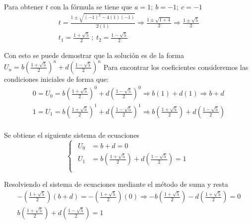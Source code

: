 \documentclass[letterpaper,11pt]{article}
\begin{document}
Para obtener $t$ con la fórmula se tiene que $a = 1; \ b = -1; \ c = -1$
\begin{equation*}
\begin{aligned}
	t = \frac{1 \pm \sqrt{(-1)^2 - 4(1)(-1)}}{2(1)} \Rightarrow \frac{1 \pm \sqrt{1 + 4}}{2} \Rightarrow \frac{1 \pm \sqrt{5}}{2} \\
	t_{1} = \frac{1 + \sqrt{5}}{2} \ ; \ t_{2} = \frac{1 - \sqrt{5}}{2}
\end{aligned}	
\end{equation*}

Con esto se puede demostrar que la solución es de la forma $ U_{n} = b(\frac{1 + \sqrt{5}}{2})^{n} + d(\frac{1 - \sqrt{5}}{2})^{n} $ \smallbreak
Para encontrar los coeficientes consideremos las condiciones iniciales de forma que:
\begin{equation*}
\begin{aligned}
	0 = U_{0} = b(\frac{1 + \sqrt{5}}{2})^{0} + d(\frac{1 - \sqrt{5}}{2})^{0} \Rightarrow b(1) + d(1) \Rightarrow b + d \\
	1 = U_{1} = b(\frac{1 + \sqrt{5}}{2})^{1} + d(\frac{1 - \sqrt{5}}{2})^{1} \Rightarrow b(\frac{1 + \sqrt{5}}{2}) + d(\frac{1 - \sqrt{5}}{2})\\
\end{aligned}
\end{equation*}

Se obtiene el siguiente sistema de ecuaciones
\begin{equation*}
	\begin{cases}
		\begin{aligned}
			U_{0} &= b + d = 0\\
			U_{1} &= b(\frac{1 + \sqrt{5}}{2}) + d(\frac{1 - \sqrt{5}}{2}) = 1\\
		\end{aligned}
	\end{cases}
\end{equation*}

Resolviendo el sistema de ecuaciones mediante el método de suma y resta
\begin{equation*}
	\begin{aligned}
		-(\frac{1 + \sqrt{5}}{2})(b+d) = -(\frac{1 + \sqrt{5}}{2})(0) \Longrightarrow -b(\frac{1 + \sqrt{5}}{2}) - d(\frac{1 + \sqrt{5}}{2}) = 0 \\
		b(\frac{1 + \sqrt{5}}{2}) + d(\frac{1 - \sqrt{5}}{2}) = 1
	\end{aligned}
\end{equation*}
\end{document}
